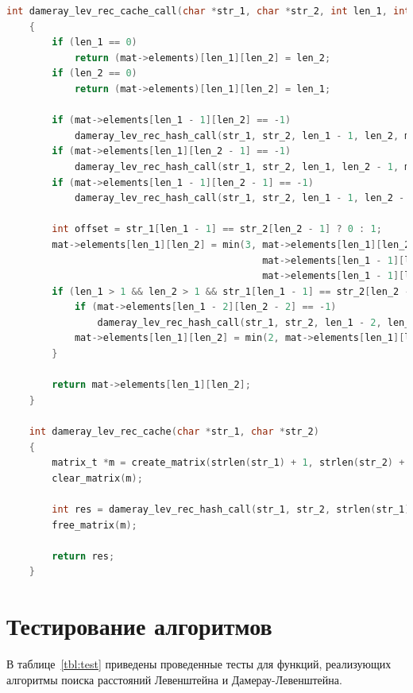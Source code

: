 \documentclass[a4paper,14pt, unknownkeysallowed]{extreport}
\begin{document}
	\begin{lstlisting}[label=damlevrechash,caption=Листинг рекурсивного алгоритма поиска расстояния Дамерау-Левенштейна с кешем,language=C]	
    int dameray_lev_rec_cache_call(char *str_1, char *str_2, int len_1, int len_2, matrix_t *mat)
    {
        if (len_1 == 0)
            return (mat->elements)[len_1][len_2] = len_2;
        if (len_2 == 0)
            return (mat->elements)[len_1][len_2] = len_1;
    
        if (mat->elements[len_1 - 1][len_2] == -1)
            dameray_lev_rec_hash_call(str_1, str_2, len_1 - 1, len_2, mat);
        if (mat->elements[len_1][len_2 - 1] == -1)
            dameray_lev_rec_hash_call(str_1, str_2, len_1, len_2 - 1, mat);
        if (mat->elements[len_1 - 1][len_2 - 1] == -1)
            dameray_lev_rec_hash_call(str_1, str_2, len_1 - 1, len_2 - 1, mat);
    
        int offset = str_1[len_1 - 1] == str_2[len_2 - 1] ? 0 : 1;
        mat->elements[len_1][len_2] = min(3, mat->elements[len_1][len_2 - 1] + 1,
    										 mat->elements[len_1 - 1][len_2] + 1,
                                             mat->elements[len_1 - 1][len_2 - 1] + offset);
        if (len_1 > 1 && len_2 > 1 && str_1[len_1 - 1] == str_2[len_2 - 2] && str_1[len_1 - 2] == str_2[len_2 - 1]) {
            if (mat->elements[len_1 - 2][len_2 - 2] == -1)
                dameray_lev_rec_hash_call(str_1, str_2, len_1 - 2, len_2 - 2, mat);
            mat->elements[len_1][len_2] = min(2, mat->elements[len_1][len_2], mat->elements[len_1 - 2][len_2 - 2] + 1);
        }
    
        return mat->elements[len_1][len_2];
    }
    
    int dameray_lev_rec_cache(char *str_1, char *str_2)
    {
        matrix_t *m = create_matrix(strlen(str_1) + 1, strlen(str_2) + 1);
        clear_matrix(m);
    
        int res = dameray_lev_rec_hash_call(str_1, str_2, strlen(str_1), strlen(str_2), m);
        free_matrix(m);
    
        return res;
    } 
	\end{lstlisting}

\section{Тестирование алгоритмов}

В таблице~\ref{tbl:test} приведены проведенные тесты для функций, реализующих алгоритмы поиска расстояний Левенштейна и Дамерау-Левенштейна.
	
\end{document}
